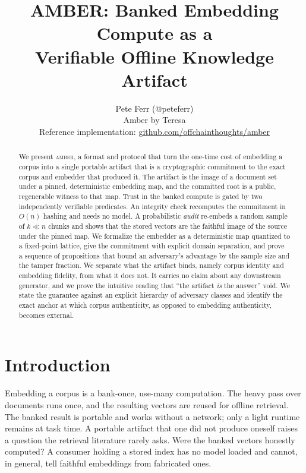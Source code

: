 \documentclass[10pt,twocolumn]{article}
\title{\LARGE\bfseries AMBER: Banked Embedding Compute as a\\[2pt]
  Verifiable Offline Knowledge Artifact}
\author{\normalsize Pete Ferr (@peteferr)\\[3pt]
  \normalsize Amber by Teresa\\[3pt]
  \footnotesize Reference implementation: \url{github.com/offchainthoughts/amber}}
\date{}
\theoremstyle{remark}
\begin{document}
\maketitle

\begin{abstract}
\noindent
We present \textsc{amber}, a format and protocol that turn the one-time cost of
embedding a corpus into a single portable artifact that is a cryptographic
commitment to the exact corpus and embedder that produced it. The artifact is
the image of a document set under a pinned, deterministic embedding map, and the
committed root is a public, regenerable witness to that map. Trust in the banked
compute is gated by two independently verifiable predicates. An integrity check
recomputes the commitment in $O(n)$ hashing and needs no model. A probabilistic
\emph{audit} re-embeds a random sample of $k \ll n$ chunks and shows that the
stored vectors are the faithful image of the source under the pinned map. We
formalize the embedder as a deterministic map quantized to a fixed-point
lattice, give the commitment with explicit domain separation, and prove a
sequence of propositions that bound an adversary's advantage by the sample size
and the tamper fraction. We separate what the artifact binds, namely corpus
identity and embedding fidelity, from what it does not. It carries no claim about
any downstream generator, and we prove the intuitive reading that ``the artifact
\emph{is} the answer'' void. We state the guarantee against an explicit hierarchy
of adversary classes and identify the exact anchor at which corpus authenticity,
as opposed to embedding authenticity, becomes external.
\end{abstract}

\section{Introduction}
Embedding a corpus is a bank-once, use-many computation. The heavy pass over
documents runs once, and the resulting vectors are reused for offline retrieval.
The banked result is portable and works without a network; only a light runtime
remains at task time. A portable artifact that one did not produce oneself raises
a question the retrieval literature rarely asks. Were the banked vectors honestly
computed? A consumer holding a stored index has no model loaded and cannot, in
general, tell faithful embeddings from fabricated ones.
\end{document}
